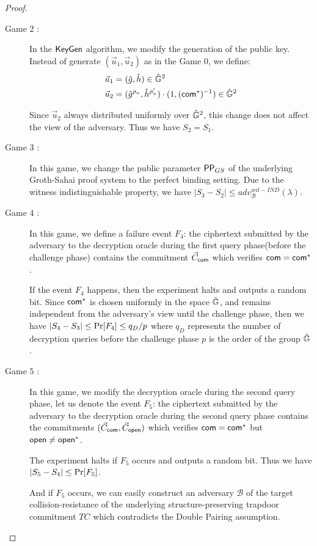 \begin{proof}
\begin{description}
  \item[\textsf{Game} $2$ :] In the ${\mathsf{KeyGen}}$ algorithm, we modify the generation of the public key. Instead of generate $(\vec{u}_1, \vec{u}_2)$ as in the \textsf{Game} 0, we define:
    \begin{align*}
      \vec{u}_1 &= (\hat{g}, \hat{h}) \in \hat{\mathbb{G}}^2\\
      \vec{u}_2 &= (\hat{g}^{\rho_u}, \hat{h}^{\rho_u'}) \cdot (1, (\mathsf{com}^*)^{-1}) \in \hat{\mathbb{G}}^2
    \end{align*}

    Since $\vec{u}_2$ always distributed uniformly over $\hat{\mathbb{G}}^2$, this change does not affect the view of the adversary. Thus we have $S_2 = S_1$.

  \item[\textsf{Game} $3$ :] In this game, we change the public parameter $\mathsf{PP}_{GS}$ of the underlying Groth-Sahai proof system to the perfect binding setting. Due to the witness indistinguishable property, we have $|S_3 - S_2| \leq adv_{\mathcal{B}}^{wit-IND}(\lambda)$.

  \item[\textsf{Game} $4$ :] In this game, we define a failure event $F_4$: the ciphertext submitted by the adversary to the decryption oracle during the first query phase(before the challenge phase) contains the commitment $\vec{C}_{\mathsf{com}}$ which verifies $\mathsf{com} = \mathsf{com}^*$.

    If the event $F_4$ happens, then the experiment halts and outputs a random bit. Since $\mathsf{com}^*$ is chosen uniformly in the space $\hat{\mathbb{G}}$, and remains independent from the adversary's view until the challenge phase, then we have $|S_4 - S_3| \leq \operatorname{Pr}[F_4] \leq q_D/p$ where $q_D$ represents the number of decryption queries before the challenge phase $p$ is the order of the group $\hat{\mathbb{G}}$.

  \item[\textsf{Game} $5$ :] In this game, we modify the decryption oracle during the second query phase, let us denote the event $F_5$: the ciphertext submitted by the adversary to the decryption oracle during the second query phase contains the commitments $(\vec{C}_{\mathsf{com}}, \vec{C}_{\mathsf{open}})$ which verifies $\mathsf{com} = \mathsf{com}^*$ but $\mathsf{open} \neq \mathsf{open}^*$.

    The experiment halts if $F_5$ occurs and outputs a random bit. Thus we have $|S_5- S_4| \leq \operatorname{Pr}[F_5]$.

    And if $F_5$ occurs, we can easily construct an adversary $\mathcal{B}$ of the target collision-resistance of the underlying structure-preserving trapdoor commitment $TC$ which contradicts the Double Pairing assumption.


\end{description}
\end{proof}
